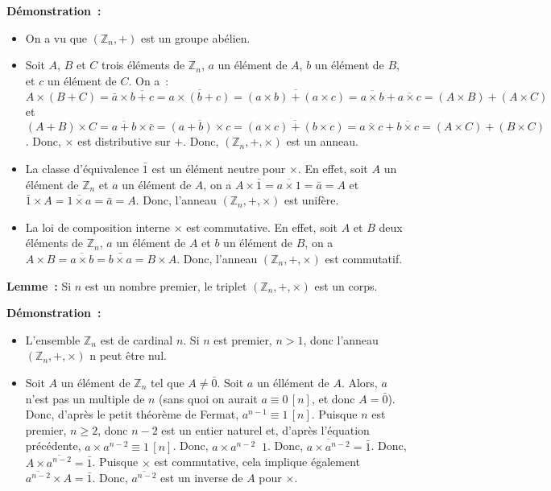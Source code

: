 \noindent\textbf{Démonstration :} 
\begin{itemize}[nosep]
    \item On a vu que $\left( \mathbb{Z}_n, + \right)$ est un groupe abélien.
    \item Soit $A$, $B$ et $C$ trois éléments de $\mathbb{Z}_n$, $a$ un élément de $A$, $b$ un élément de $B$, et $c$ un élément de $C$.
        On a : $A \times (B + C) = \bar{a} \times \overline{b+c} = \overline{a \times (b+c)} = \overline{(a \times b) + (a \times c)} = \overline{a \times b} + \overline{a \times c} = (A \times B) + (A \times C)$ et $(A+B) \times C  = \overline{a+b} \times \bar{c} = \overline{(a+b) \times c} = \overline{(a \times c) + (b \times c)} = \overline{a \times c} + \overline{b \times c} = (A \times C) + (B \times C)$.
        Donc, $\times$ est distributive sur $+$.
        Donc, $\left( \mathbb{Z}_n, +, \times \right)$ est un anneau.
    \item La classe d'équivalence $\bar{1}$ est un élément neutre pour $\times$. 
        En effet, soit $A$ un élément de $\mathbb{Z}_n$ et $a$ un élément de $A$, on a $A \times \bar{1} = \overline{a \times 1} = \bar{a} = A$ et $\bar{1} \times A = \overline{1 \times a} = \bar{a} = A$.
        Donc, l'anneau $\left( \mathbb{Z}_n, +, \times \right)$ est unifère.
    \item La loi de composition interne $\times$ est commutative.
        En effet, soit $A$ et $B$ deux éléments de $\mathbb{Z}_n$, $a$ un élément de $A$ et $b$ un élément de $B$, on a $A \times B = \overline{a \times b} = \bar{b \times a} = B \times A$.
        Donc, l'anneau $\left( \mathbb{Z}_n, +, \times \right)$ est commutatif.
\end{itemize}

\done

\medskip

\noindent\textbf{Lemme :} Si $n$ est un nombre premier, le triplet $\left( \mathbb{Z}_n, +, \times \right)$ est un corps. 

\medskip

\noindent\textbf{Démonstration :} 
\begin{itemize}[nosep]
    \item L'ensemble $\mathbb{Z}_n$ est de cardinal $n$. 
        Si $n$ est premier, $n > 1$, donc l'anneau $\left( \mathbb{Z}_n, +, \times \right)$ n peut être nul.
    \item Soit $A$ un élément de $\mathbb{Z}_n$ tel que $A \neq \bar{0}$.
        Soit $a$ un éllément de $A$. 
        Alors, $a$ n'est pas un multiple de $n$ (sans quoi on aurait $a \equiv 0 \, [n]$, et donc $A = \bar{0}$).
        Donc, d'après le petit théorème de Fermat, $a^{n-1} \equiv 1 \, [n]$. 
        Puisque $n$ est premier, $n \geq 2$, donc $n-2$ est un entier naturel et, d'après l'équation précédente, $a \times a^{n-2} \equiv 1 \, [n]$. 
        Donc, $a \times a^{n-2} \mathop{R_n} 1$.
        Donc, $\overline{a \times a^{n-2}} = \bar{1}$.
        Donc, $A \times \overline{a^{n-2}} = \bar{1}$.
        Puisque $\times$ est commutative, cela implique également $\overline{a^{n-2}} \times A = \bar{1}$.
        Donc, $\overline{a^{n-2}}$ est un inverse de $A$ pour $\times$.
\end{itemize}

